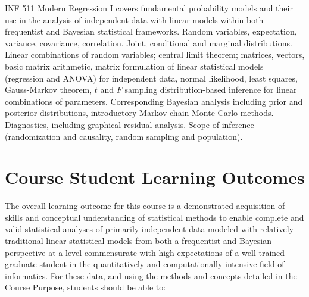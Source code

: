 \documentclass[
  letterpaper,
  DIV=11,
  numbers=noendperiod]{scrreprt}
\begin{document}
INF 511 Modern Regression I covers fundamental probability models and
their use in the analysis of independent data with linear models within
both frequentist and Bayesian statistical frameworks. Random variables,
expectation, variance, covariance, correlation. Joint, conditional and
marginal distributions. Linear combinations of random variables; central
limit theorem; matrices, vectors, basic matrix arithmetic, matrix
formulation of linear statistical models (regression and ANOVA) for
independent data, normal likelihood, least squares, Gauss-Markov
theorem, \(t\) and \(F\) sampling distribution-based inference for
linear combinations of parameters. Corresponding Bayesian analysis
including prior and posterior distributions, introductory Markov chain
Monte Carlo methods. Diagnostics, including graphical residual analysis.
Scope of inference (randomization and causality, random sampling and
population).

\hypertarget{course-student-learning-outcomes}{%
\section{Course Student Learning
Outcomes}\label{course-student-learning-outcomes}}

The overall learning outcome for this course is a demonstrated
acquisition of skills and conceptual understanding of statistical
methods to enable complete and valid statistical analyses of primarily
independent data modeled with relatively traditional linear statistical
models from both a frequentist and Bayesian perspective at a level
commensurate with high expectations of a well-trained graduate student
in the quantitatively and computationally intensive field of
informatics. For these data, and using the methods and concepts detailed
in the Course Purpose, students should be able to:
\end{document}
